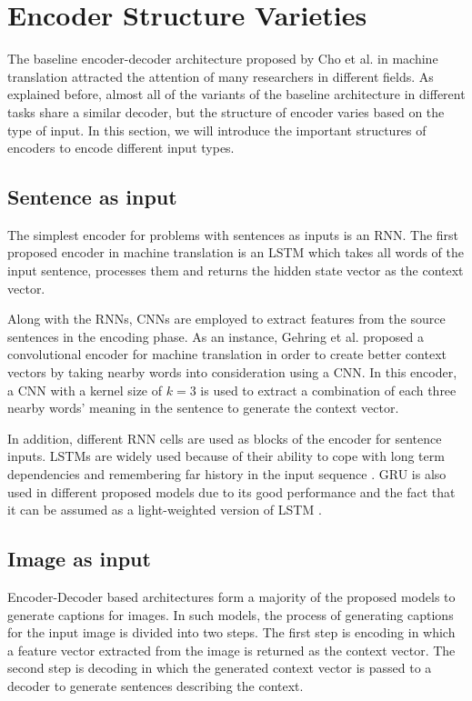 \documentclass[preprint, 10pt]{elsarticle}
\begin{document}
		
	\section{Encoder Structure Varieties}
	The baseline encoder-decoder architecture proposed by Cho et al. \cite{cho2014learning} in machine translation attracted the attention of many researchers in different fields. As explained before, almost all of the variants of the baseline architecture in different tasks share a similar decoder, but the structure of encoder varies based on the type of input. In this section, we will introduce the important structures of encoders to encode different input types.
		\subsection{Sentence as input}
		The simplest encoder for problems with sentences as inputs is an RNN. The first proposed encoder in machine translation is an LSTM which takes all words of the input sentence, processes them and returns the hidden state vector as the context vector. 
		
		Along with the RNNs, CNNs are employed to extract features from the source sentences in the encoding phase. As an instance, Gehring et al. proposed a convolutional encoder for machine translation in order to create better context vectors by taking nearby words into consideration using a CNN\cite{gehring2016convolutional}. In this encoder, a CNN with a kernel size of $k = 3$ is used to extract a combination of each three nearby words' meaning in the sentence to generate the context vector. 
		
		In addition, different RNN cells are used as blocks of the encoder for sentence inputs. LSTMs\cite{hochreiter1997long} are widely used because of their ability to cope with long term dependencies and remembering far history in the input sequence \cite{sutskever2014sequence}\cite{bahdanau2014neural}\cite{luong2015stanford}\cite{xu2015show}. GRU \cite{cho2014learning} is also used in different proposed models due to its good performance and the fact that it can be assumed as a light-weighted version of LSTM \cite{cho2014learning}\cite{mi2016coverage}\cite{he2016dual}\cite{tu2017context}.
		\subsection{Image as input}
		Encoder-Decoder based architectures form a majority of the proposed models to generate captions for images. In such models, the process of generating captions for the input image is divided into two steps. The first step is encoding in which a feature vector extracted from the image is returned as the context vector. The second step is decoding in which the generated context vector is passed to a decoder to generate sentences describing the context. 
		
\end{document}

